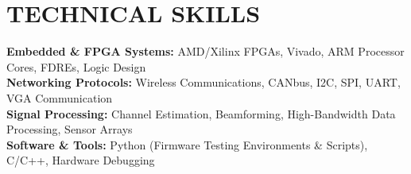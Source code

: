 \documentclass[letterpaper,11pt]{article}
\begin{document}
\section{TECHNICAL SKILLS}
 \begin{itemize}[leftmargin=0.15in, label={}]
    \small{\item{
     \textbf{Embedded \& FPGA Systems:} AMD/Xilinx FPGAs, Vivado, ARM Processor Cores, FDREs, Logic Design \\
     \textbf{Networking Protocols:} Wireless Communications, CANbus, I2C, SPI, UART, VGA Communication \\
     \textbf{Signal Processing:} Channel Estimation, Beamforming, High-Bandwidth Data Processing, Sensor Arrays \\
     \textbf{Software \& Tools:} Python (Firmware Testing Environments \& Scripts), C/C++, Hardware Debugging
    }}
 \end{itemize}


\end{document}
